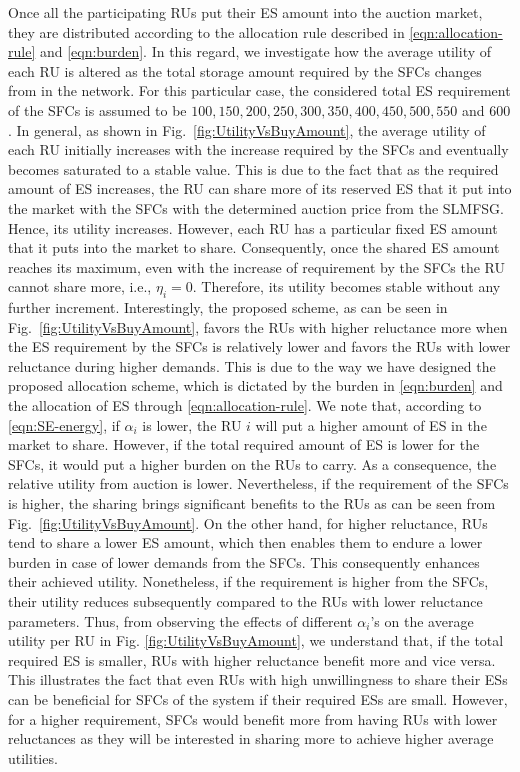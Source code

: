\documentclass[journal,10pt]{IEEEtran}
\begin{document}
Once all the participating RUs put their ES amount into the auction market, they are distributed according to the allocation rule described in \eqref{eqn:allocation-rule} and \eqref{eqn:burden}. In this regard, we investigate how the average utility of each RU is altered as the total storage amount required by the SFCs changes from in the network. For this particular case, the considered total ES requirement of the SFCs is assumed to be $100, 150, 200, 250, 300, 350, 400, 450, 500, 550$ and $600$. In general, as shown in Fig.~\ref{fig:UtilityVsBuyAmount}, the average utility of each RU initially increases with the increase required by the SFCs and eventually becomes saturated to a stable value. This is due to the fact that as the required amount of ES increases, the RU can share more of its reserved ES that it put into the market with the SFCs with the determined auction price from the SLMFSG. Hence, its utility increases. However, each RU has a particular fixed ES amount that it puts into the market to share. Consequently, once the shared  ES amount reaches its maximum, even with the increase of requirement by the SFCs the RU cannot share more, i.e., $\eta_i = 0$. Therefore, its utility becomes stable without any further increment. Interestingly, the proposed scheme, as can be seen in Fig.~\ref{fig:UtilityVsBuyAmount}, favors the RUs with higher reluctance more when the ES requirement by the SFCs is relatively lower and favors the RUs with lower reluctance during higher demands. This is due to the way we have designed the proposed allocation scheme, which is dictated by the burden in \eqref{eqn:burden} and the allocation of ES through \eqref{eqn:allocation-rule}. We note that, according to \eqref{eqn:SE-energy}, if $\alpha_i$ is lower, the RU $i$ will put a higher amount of ES in the market to share. However, if the total required amount of ES is lower for the SFCs, it would put a higher burden on the RUs to carry. As a consequence, the relative utility from auction is lower. Nevertheless, if the requirement of the SFCs is higher, the sharing brings significant benefits to the RUs as can be seen from Fig.~\ref{fig:UtilityVsBuyAmount}. On the other hand, for higher reluctance, RUs tend to share a lower ES amount, which then enables them to endure a lower burden in case of lower demands from the SFCs. This consequently enhances their achieved utility. Nonetheless, if the requirement is higher from the SFCs, their utility reduces subsequently compared to the RUs with lower reluctance parameters. Thus, from observing the effects of different $\alpha_i$'s on the average utility per RU in Fig. \ref{fig:UtilityVsBuyAmount}, we understand that, if the total required ES is smaller, RUs with higher reluctance benefit more and vice versa. This illustrates the fact that even RUs with high unwillingness to share their ESs can be beneficial for SFCs of the system if their required ESs are small. However, for a higher requirement, SFCs would benefit more from having RUs with lower reluctances as they will be interested in sharing more to achieve higher average utilities.
\end{document}
